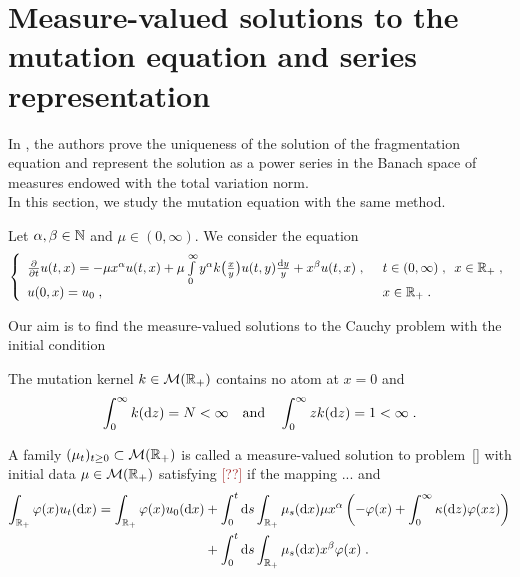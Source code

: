 \documentclass[11pt]{amsart}
\newcommand{\dd}{\mathrm{d}}
\newcommand{\ndr}[1]{\textcolor{brown}{[#1]}}
\begin{document}

\section{Measure-valued solutions to the mutation equation and series representation}
\label{s:measure_series_repr}

In \cite{doumic2021inverse}, the authors prove the uniqueness of the solution of the fragmentation equation and represent the solution as a power series in the Banach space of measures endowed with the total variation norm. \\

In this section, we study the mutation equation with the same method. 

Let $\alpha, \beta \in \mathbb{N}$ and $\mu \in (0, \infty)$.  
We consider the equation 
\begin{equation}\left\{
    \begin{array}{ll}
	\frac{\partial}{\partial t}u(t,x) = - \mu x^\alpha u(t,x) + \mu \int\limits_{0}^{\infty} y^\alpha k\big( \frac{x}{y}\big)u(t,y) \frac{\mathrm dy}{y} + x^\beta u(t,x) \; , \enspace
	& t \in (0, \infty) \; , \enspace x \in \mathbb{R}_+ \; ,
	\\ u(0, x) = u_0 \; , \enspace
	&  x \in \mathbb{R}_+
	\; .
    \end{array}
	\right.
    \label{eq:DET00.2.4}
\end{equation}

Our aim is to find the measure-valued solutions to the Cauchy problem with the initial condition

\begin{hypothesis}
The mutation kernel $k \in \mathcal{M}(\mathbb{R}_+)$ contains no atom at $x = 0$ and 
$$ \int_0^\infty k(\dd z) = N < \infty \mtext{and} \int_0^\infty z k(\dd z) = 1 < \infty \eqfinp$$ 
\end{hypothesis}

\begin{definition}\label{def:DETinv2.1}
    A family $(\mu_t)_{t \geq 0} \subset \mathcal{M}(\mathbb{R}_+)$ is called a measure-valued solution to problem~\eqref{} with initial data $\mu \in \mathcal{M}(\mathbb{R}_+)$ satisfying \ndr{??} if the mapping ... 
    and 
    \begin{align*}
        \int_{\RR_+} \varphi(x) u_t(\dd x)
        = 
        \int_{\RR_+} \varphi(x) u_0(\dd x) 
        &+ \int_0^t\dd s \int_{\RR_+} \mu_s(\dd x)\mu x^\alpha \left( - \varphi(x) + \int_0^\infty \kappa(\dd z)\varphi(xz)\right) \\
        &+ \int_0^t\dd s \int_{\RR_+} \mu_s(\dd x) x^\beta \varphi(x)
        \eqfinp
    \end{align*}
\end{definition}
\end{document}
